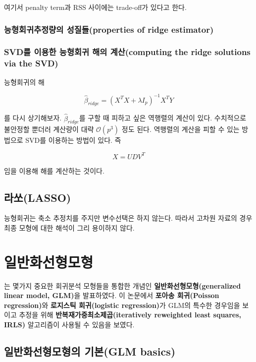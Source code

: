 \documentclass[b5paper,]{scrbook}
\theoremstyle{plain}
\theoremstyle{definition}
\numberwithin{equation}{section}
\begin{document}
여기서 penalty term과 RSS 사이에는 trade-off가 있다고 한다.

\subsection{능형회귀추정량의 성질들(properties of ridge
estimator)}\label{-properties-of-ridge-estimator}

\subsection{SVD를 이용한 능형회귀 해의 계산(computing the ridge
solutions via the
SVD)}\label{svd----computing-the-ridge-solutions-via-the-svd}

능형회귀의 해

\[\hat{\beta}_{ridge}=(X^{T}X+\lambda I_{p})^{-1}X^{T}Y\]

를 다시 상기해보자. \(\hat{\beta}_{ridge}\)를 구할 때 피하고 싶은
역행렬의 계산이 있다. 수치적으로 불안정할 뿐더러 계산량이 대략
\(\mathcal{O}(p^{3})\) 정도 된다. 역행렬의 계산을 피할 수 있는 방법으로
SVD를 이용하는 방법이 있다. 즉

\[X=UDV^{T}\]

임을 이용해 해를 계산하는 것이다.

\section{라쏘(LASSO)}\label{lasso}

능형회귀는 축소 추정치를 주지만 변수선택은 하지 않는다. 따라서 고차원
자료의 경우 최종 모형에 대한 해석이 그리 용이하지 않다.

\chapter{일반화선형모형}\label{glm}

\citep{Nelder1972}는 몇가지 중요한 회귀분석 모형들을 통합한 개념인
\textbf{일반화선형모형(generalized linear model, GLM)}을 발표하였다. 이
논문에서 \textbf{포아송 회귀(Poisson regression)}와 \textbf{로지스틱
회귀(logistic regression)}가 GLM의 특수한 경우임을 보이고 추정을 위해
\textbf{반복재가중최소제곱(iteratively reweighted least squares, IRLS)}
알고리즘이 사용될 수 있음을 보였다.

\section{일반화선형모형의 기본(GLM basics)}\label{-glm-basics}
\end{document}
